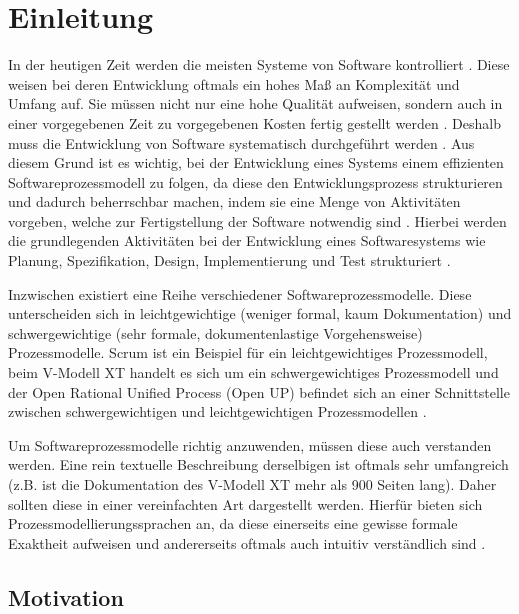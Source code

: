 \chapter{Einleitung}\label{sec:chapter1}

In der heutigen Zeit werden die meisten Systeme von Software kontrolliert \cite{Puntambekar2007}. Diese weisen bei deren Entwicklung oftmals ein hohes Maß an Komplexität und Umfang auf. Sie müssen nicht nur eine hohe Qualität aufweisen, sondern auch in einer vorgegebenen Zeit zu vorgegebenen Kosten fertig gestellt werden \cite{Grechenig2010}. Deshalb muss die Entwicklung von Software systematisch durchgeführt werden \cite{gumm2012einführung}. Aus diesem Grund ist es wichtig, bei der Entwicklung eines Systems einem effizienten Softwareprozessmodell zu folgen, da diese den Entwicklungsprozess strukturieren und dadurch beherrschbar machen, indem sie eine Menge von Aktivitäten vorgeben, welche zur Fertigstellung der Software notwendig sind \cite{richling2011autonomie}. Hierbei werden die grundlegenden Aktivitäten bei der Entwicklung eines Softwaresystems wie Planung, Spezifikation, Design, Implementierung und Test strukturiert \cite{gumm2012einführung, hanser2010}. \newline

Inzwischen existiert eine Reihe verschiedener Softwareprozessmodelle. Diese unterscheiden sich in leichtgewichtige (weniger formal, kaum Dokumentation) und schwergewichtige (sehr formale, dokumentenlastige Vorgehensweise) Prozessmodelle. Scrum ist ein Beispiel für ein leichtgewichtiges Prozessmodell, beim V-Modell XT handelt es sich um ein schwergewichtiges Prozessmodell und der Open Rational Unified Process (Open UP) befindet sich an einer Schnittstelle zwischen schwergewichtigen und leichtgewichtigen Prozessmodellen \cite{Hanser2010}.\newline

Um Softwareprozessmodelle richtig anzuwenden, müssen diese auch verstanden werden. Eine rein textuelle Beschreibung derselbigen ist oftmals sehr umfangreich (z.B. ist die Dokumentation des V-Modell XT mehr als 900 Seiten lang). Daher sollten diese in einer vereinfachten Art dargestellt werden. Hierfür bieten sich Prozessmodellierungssprachen an, da diese einerseits eine gewisse formale Exaktheit aufweisen und andererseits oftmals auch intuitiv verständlich sind \cite{thomas2009,kircher2006}. \newline

\section{Motivation}



